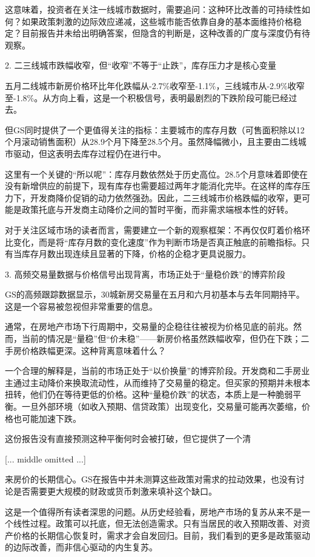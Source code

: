 \documentclass[11pt]{ctexart}
\begin{document}
这意味着，投资者在关注一线城市数据时，需要追问：这种环比改善的可持续性如何？如果政策刺激的边际效应递减，这些城市能否依靠自身的基本面维持价格稳定？目前报告并未给出明确答案，但隐含的判断是，这种改善的广度与深度仍有待观察。

2. 二三线城市跌幅收窄，但“收窄”不等于“止跌”，库存压力才是核心变量

五月二线城市新房价格环比年化跌幅从-2.7\%收窄至-1.1\%，三线城市从-2.9\%收窄至-1.8\%。从方向上看，这是一个积极信号，表明最剧烈的下跌阶段可能已经过去。

但GS同时提供了一个更值得关注的指标：主要城市的库存月数（可售面积除以12个月滚动销售面积）从28.9个月下降至28.5个月。虽然降幅微小，且主要由二线城市驱动，但这表明去库存过程仍在进行中。

这里有一个关键的“所以呢”：库存月数依然处于历史高位。28.5个月意味着即使在没有新增供应的前提下，现有库存也需要超过两年才能消化完毕。在这样的库存压力下，开发商降价促销的动力依然强劲。因此，二三线城市价格跌幅的收窄，更可能是政策托底与开发商主动降价之间的暂时平衡，而非需求端根本性的好转。

对于关注区域市场的读者而言，需要建立一个新的观察框架：不再仅仅盯着价格环比变化，而是将“库存月数的变化速度”作为判断市场是否真正触底的前瞻指标。只有当库存月数出现连续且显著的下降，价格的企稳才更具说服力。

3. 高频交易量数据与价格信号出现背离，市场正处于“量稳价跌”的博弈阶段

GS的高频跟踪数据显示，30城新房交易量在五月和六月初基本与去年同期持平。这是一个容易被忽视但非常重要的信息。

通常，在房地产市场下行周期中，交易量的企稳往往被视为价格见底的前兆。然而，当前的情况是“量稳”但“价未稳”——新房价格虽然跌幅收窄，但仍在下跌；二手房价格跌幅更深。这种背离意味着什么？

一个合理的解释是，当前的市场正处于“以价换量”的博弈阶段。开发商和二手房业主通过主动降价来换取流动性，从而维持了交易量的稳定。但买家的预期并未根本扭转，他们仍在等待更低的价格。这种“量稳价跌”的状态，本质上是一种脆弱平衡。一旦外部环境（如收入预期、信贷政策）出现变化，交易量可能再次萎缩，价格也可能加速下跌。

这份报告没有直接预测这种平衡何时会被打破，但它提供了一个清

[... middle omitted ...]

来房价的长期信心。GS在报告中并未测算这些政策对需求的拉动效果，也没有讨论是否需要更大规模的财政或货币刺激来填补这个缺口。

这是一个值得所有读者深思的问题。从历史经验看，房地产市场的复苏从来不是一个线性过程。政策可以托底，但无法创造需求。只有当居民的收入预期改善、对资产价格的长期信心恢复时，需求才会自发回归。目前，我们看到的更多是政策驱动的边际改善，而非信心驱动的内生复苏。
\end{document}
